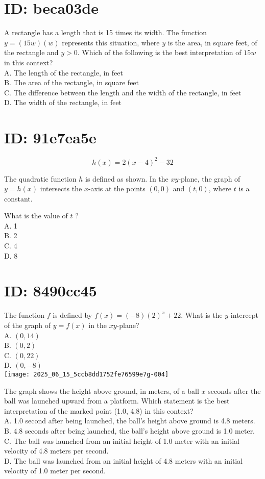 

\section*{ID: beca03de}
A rectangle has a length that is 15 times its width. The function $y=(15 w)(w)$ represents this situation, where $y$ is the area, in square feet, of the rectangle and $y>0$. Which of the following is the best interpretation of $15 w$ in this context?\\
A. The length of the rectangle, in feet\\
B. The area of the rectangle, in square feet\\
C. The difference between the length and the width of the rectangle, in feet\\
D. The width of the rectangle, in feet

\section*{ID: 91e7ea5e}
$$
h(x)=2(x-4)^{2}-32
$$

The quadratic function $h$ is defined as shown. In the $x y$-plane, the graph of $y=h(x)$ intersects the $x$-axis at the points $(0,0)$ and $(t, 0)$, where $t$ is a constant.

What is the value of $t$ ?\\
A. 1\\
B. 2\\
C. 4\\
D. 8

\section*{ID: 8490cc45}
The function $f$ is defined by $f(x)=(-8)(2)^{x}+22$. What is the $y$-intercept of the graph of $y=f(x)$ in the $x y$-plane?\\
A. $(0,14)$\\
B. $(0,2)$\\
C. $(0,22)$\\
D. $(0,-8)$\\
\texttt{[image: 2025\_06\_15\_5ccb8dd1752fe76599e7g-004]}

The graph shows the height above ground, in meters, of a ball $x$ seconds after the ball was launched upward from a platform. Which statement is the best interpretation of the marked point (1.0, 4.8) in this context?\\
A. 1.0 second after being launched, the ball's height above ground is 4.8 meters.\\
B. 4.8 seconds after being launched, the ball's height above ground is 1.0 meter.\\
C. The ball was launched from an initial height of 1.0 meter with an initial velocity of 4.8 meters per second.\\
D. The ball was launched from an initial height of 4.8 meters with an initial velocity of 1.0 meter per second.


